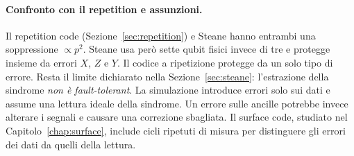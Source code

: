 \begin{onehalfspace}
\paragraph{Confronto con il repetition e assunzioni.}
Il repetition code (Sezione~\ref{sec:repetition}) e Steane hanno entrambi una soppressione $\propto p^2$. Steane usa però sette qubit fisici invece di tre e protegge insieme da errori $X$, $Z$ e $Y$. Il codice a ripetizione protegge da un solo tipo di errore. Resta il limite dichiarato nella Sezione~\ref{sec:steane}: l'estrazione della sindrome \emph{non è fault-tolerant}. La simulazione introduce errori solo sui dati e assume una lettura ideale della sindrome. Un errore sulle ancille potrebbe invece alterare i segnali e causare una correzione sbagliata. Il surface code, studiato nel Capitolo~\ref{chap:surface}, include cicli ripetuti di misura per distinguere gli errori dei dati da quelli della lettura.

\end{onehalfspace}
